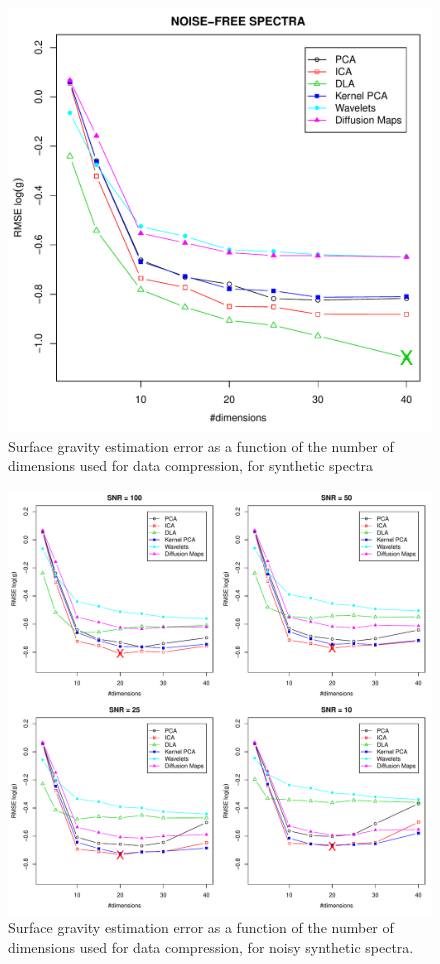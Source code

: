 \documentclass[a4paper,fleqn,usenatbib]{mnras}
\begin{document}
\begin{figure}
\centering\includegraphics[width=\columnwidth]{flamesHR10_SNR=000_Logg_log_BestSVM_N-RMSE_test.pdf}
\caption{Surface gravity estimation error as a function of the number of
  dimensions used for data compression, for synthetic spectra}
\label{fig:03}
\end{figure}

\begin{figure}
\centering\includegraphics[width=\textwidth]{flamesHR10_Logg_log_BestSVM_N-RMSE_test.pdf}
\caption{Surface gravity estimation error as a function of the number of
  dimensions used for data compression, for noisy synthetic
  spectra.}
\label{fig:04}
\end{figure}
\end{document}
